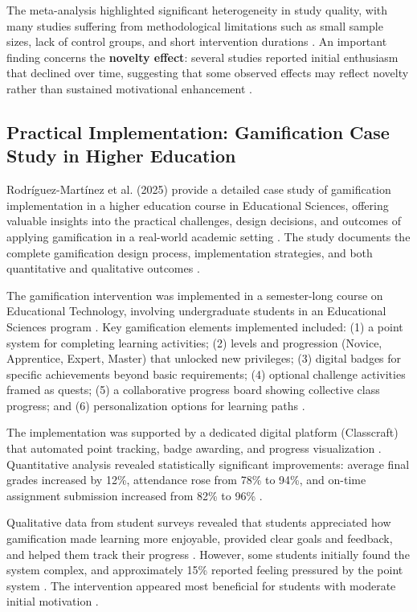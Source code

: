 \documentclass[12pt,a4paper]{article}
\begin{document}
The meta-analysis highlighted significant heterogeneity in study quality, with many studies suffering from methodological limitations such as small sample sizes, lack of control groups, and short intervention durations \parencite{wu2024}. An important finding concerns the \textbf{novelty effect}: several studies reported initial enthusiasm that declined over time, suggesting that some observed effects may reflect novelty rather than sustained motivational enhancement \parencite{wu2024}.


\subsection{Practical Implementation: Gamification Case Study in Higher Education}

Rodríguez-Martínez et al. (2025) provide a detailed case study of gamification implementation in a higher education course in Educational Sciences, offering valuable insights into the practical challenges, design decisions, and outcomes of applying gamification in a real-world academic setting \parencite{rodriguez2025}. The study documents the complete gamification design process, implementation strategies, and both quantitative and qualitative outcomes \parencite{rodriguez2025}.

The gamification intervention was implemented in a semester-long course on Educational Technology, involving undergraduate students in an Educational Sciences program \parencite{rodriguez2025}. Key gamification elements implemented included: (1) a point system for completing learning activities; (2) levels and progression (Novice, Apprentice, Expert, Master) that unlocked new privileges; (3) digital badges for specific achievements beyond basic requirements; (4) optional challenge activities framed as quests; (5) a collaborative progress board showing collective class progress; and (6) personalization options for learning paths \parencite{rodriguez2025}.

The implementation was supported by a dedicated digital platform (Classcraft) that automated point tracking, badge awarding, and progress visualization \parencite{rodriguez2025}. Quantitative analysis revealed statistically significant improvements: average final grades increased by 12\%, attendance rose from 78\% to 94\%, and on-time assignment submission increased from 82\% to 96\% \parencite{rodriguez2025}.

Qualitative data from student surveys revealed that students appreciated how gamification made learning more enjoyable, provided clear goals and feedback, and helped them track their progress \parencite{rodriguez2025}. However, some students initially found the system complex, and approximately 15\% reported feeling pressured by the point system \parencite{rodriguez2025}. The intervention appeared most beneficial for students with moderate initial motivation \parencite{rodriguez2025}.
\end{document}
